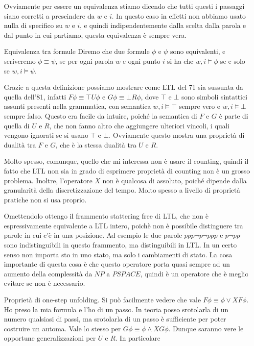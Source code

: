 Ovviamente per essere un equivalenza stiamo dicendo che tutti questi i passaggi siano corretti a prescindere da \(w\) e \(i\).
In questo caso in effetti non abbiamo usato nulla di specifico su \(w\) e \(i\), e quindi indipendentemente dalla scelta dalla parola e dal punto in cui partiamo, questa equivalenza è sempre vera.

\begin{definition}{Equivalenza tra formule}
  Diremo che due formule \(\phi\) e \(\psi\) sono equivalenti, e scriveremo \(\phi \equiv \psi\), se per ogni parola \(w\) e ogni punto \(i\) si ha che \(w,i \models \phi\) se e solo se \(w,i \models \psi\).
\end{definition}

Grazie a questa definizione possiamo mostrare come LTL del 71 sia sussunta da quella dell'81, infatti \(F\phi \equiv \top U \phi\) e \(G\phi \equiv \bot R \phi\), dove \(\top\) e \(\bot\) sono simboli sintattici assunti presenti nella grammatica, con semantica \(w,i \models \top\) sempre vero e \(w,i \models \bot\) sempre falso. Questo era facile da intuire, poiché la semantica di \(F\) e \(G\) è parte di quella di \(U\) e \(R\), che non fanno altro che aggiungere ulteriori vincoli, i quali vengono ignorati se si usano \(\top\) e \(\bot\). Ovviamente questo mostra una proprietà di dualità tra \(F\) e \(G\), che è la stessa dualità tra \(U\) e \(R\).

Molto spesso, comunque, quello che mi interessa non è usare il counting, quindi il fatto che LTL non sia in grado di esprimere proprietà di counting non è un grosso problema. Inoltre, l'operatore \(X\) non è qualcosa di assoluto, poiché dipende dalla granularità della discretizzazione del tempo. Molto spesso a livello di proprietà pratiche non si usa proprio.

Omettendolo ottengo il frammento stattering free di LTL, che non è espressivamente equivalente a LTL intero, poichè non è possibile distinguere tra parole in cui c'è  in una posizione. Ad esempio le due parole \(ppp\neg p \neg p pp\) e \(p\neg p p\) sono indistinguibili in questo frammento, ma distinguibili in LTL\@. In un certo senso non importa  sto in uno stato, ma solo i cambiamenti di stato. La cosa importante di questa cosa è che questo operatore porta quasi sempre ad un aumento della complessità da \(NP\) a \(PSPACE\), quindi è un operatore che è meglio evitare se non è necessario.

Proprietà di one-step unfolding. Si può facilmente vedere che vale \(F\phi\equiv \phi \lor X F \phi\). Ho preso la mia formula e l'ho  di un passo. In teoria posso srotolarla di un numero qualsiasi di passi, ma srotolarla di un passo è sufficiente per poter costruire un automa. Vale lo stesso per \(G\phi\equiv\phi\land XG\phi\). Dunque saranno vere le opportune generalizzazioni per \(U\) e \(R\). In particolare

